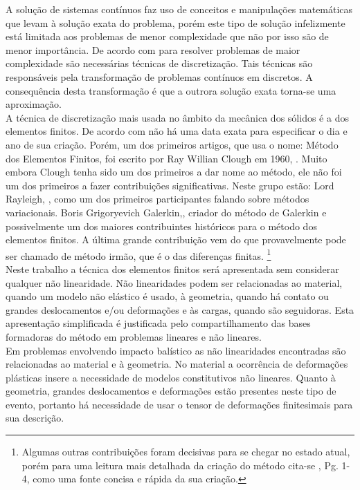A solução de sistemas contínuos faz uso de conceitos e manipulações matemáticas que levam à solução exata do problema, porém este tipo de solução infelizmente está limitada aos problemas de menor complexidade que não por isso são de menor importância. De acordo com \cite{zienkiewicz2013} para resolver problemas de maior complexidade são necessárias técnicas de discretização. Tais técnicas são responsáveis pela transformação de problemas contínuos em discretos. A consequência desta transformação é que a outrora solução exata torna-se uma aproximação. \\

A técnica de discretização mais usada no âmbito da mecânica dos sólidos é a dos elementos finitos. De acordo com \cite{zienkiewicz2013} não há uma data exata para especificar o dia e ano de sua criação. Porém, um dos primeiros artigos,  que usa o nome: Método dos Elementos Finitos, foi escrito por Ray Willian Clough em 1960, \cite{CloughFEA}. Muito embora Clough tenha sido um dos primeiros a dar nome ao método, ele não foi um dos primeiros a fazer contribuições significativas. Neste grupo estão: Lord Rayleigh, \cite{Rayleigh}, como um dos primeiros participantes falando sobre métodos variacionais. Boris Grigoryevich Galerkin,\cite{Galerkin}, criador do método de Galerkin e possivelmente um dos maiores contribuintes históricos para o método dos elementos finitos. A última grande contribuição vem do que provavelmente pode ser chamado de método irmão, que é o das diferenças finitas. \footnote{Algumas outras contribuições foram decisivas para se chegar no estado atual, porém  para uma leitura mais detalhada da criação do método cita-se ,\cite{zienkiewicz2013} Pg. 1-4, como uma fonte concisa e rápida da sua criação.} \\

Neste trabalho a técnica dos elementos finitos será apresentada sem considerar qualquer não linearidade. Não linearidades podem ser relacionadas ao material, quando um modelo não elástico é usado, à geometria, quando há contato ou grandes deslocamentos e/ou deformações e às cargas, quando são seguidoras. Esta apresentação simplificada é justificada pelo compartilhamento das bases formadoras do método em problemas lineares e não lineares.  \\

Em problemas envolvendo impacto balístico as não linearidades encontradas são relacionadas ao material e à geometria. No material a ocorrência de deformações plásticas insere a necessidade de modelos constitutivos não lineares. Quanto à geometria, grandes deslocamentos e deformações estão presentes neste tipo de evento, portanto há necessidade de usar o tensor de deformações finitesimais para sua descrição. \\ 

